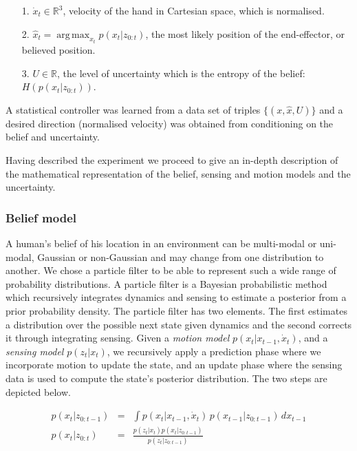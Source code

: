 \begin{enumerate}
 \item[1.] $\dot{x}_t \in \mathbb{R}^{3}$, velocity of the hand in Cartesian
space, which is normalised. 
 \item[2.] $\hat{x}_t = \operatorname*{arg\,max}_{x_t} p(x_{t}|z_{0:t})$, the most likely position of the
end-effector, or believed position.
 \item[3.] $U \in \mathbb{R}$, the level of uncertainty which is the entropy of the belief: $H\left(p(x_{t}|z_{0:t})\right)$.
\end{enumerate}
A statistical controller was learned from a data set of triples $\{(x,\hat{x},U)\}$
and a desired direction (normalised velocity) was obtained from conditioning on the belief and uncertainty.

Having described the experiment we proceed to give an in-depth description of the mathematical representation of
the belief, sensing and motion models and the uncertainty. 


\subsubsection{Belief model}


A human's belief of his location in an environment can be multi-modal or uni-modal, Gaussian or non-Gaussian and may change from one distribution to another. 
We chose a particle filter to be able to represent such a wide range of probability distributions. A particle filter is a Bayesian probabilistic method 
which recursively integrates dynamics and sensing to estimate a posterior from a prior probability density. The particle filter has two elements. The first 
estimates a distribution over the possible next state given dynamics and the second corrects it through integrating sensing. Given 
a \textit{motion model} $p(x_{t}|x_{t-1},\dot{x}_{t})$, and a \textit{sensing model} $p(z_{t}|x_{t})$, we recursively apply a prediction phase where we incorporate
motion to update the state, and an update phase where the sensing data is used to compute the state's posterior distribution. The two steps are depicted below.

\begin{eqnarray}
 p(x_{t}|z_{0:t-1}) &=& \int p(x_{t}|x_{t-1},\dot{x}_{t})\,p(x_{t-1}|z_{0:t-1})\,dx_{t-1} \\
 p(x_{t}|z_{0:t}) &=& \frac{p(z_{t}|x_{t})p(x_{t}|z_{0:t-1})}{p(z_{t}|z_{0:t-1})}
\end{eqnarray}

